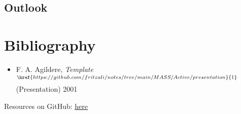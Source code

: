 	\subsection{Outlook}

	\section{Bibliography}

	\begin{frame}
		\begin{center}\textcolor{MASS}{}\end{center}\vspace{2ex}
		\begin{itemize}
			\item F. A. Agildere, {\itshape{Template}}$^{\href{https://github.com/fritzali/notes/tree/main/MASS/Active/presentation}{1}}$
				  (Presentation) 2001
		\end{itemize}
		\vspace{2ex}
		Resources on GitHub: \href{https://github.com/fritzali/notes/tree/main/MASS/Active/presentation/template}{here}
	\end{frame}

